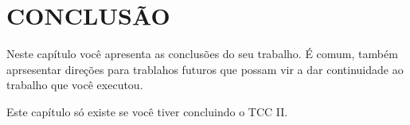 \newpage
\chapter{CONCLUSÃO}\label{cap:conclusao}


Neste capítulo você apresenta as conclusões do seu trabalho. É comum, também aprsesentar direções para trablahos futuros que possam vir a dar continuidade ao trabalho que você executou.

Este capítulo só existe se você tiver concluindo o TCC II. 


